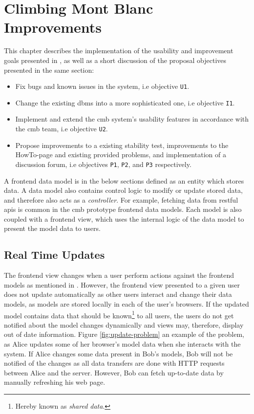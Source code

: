 \chapter{Climbing Mont Blanc Improvements}
\label{ch:improvements}
This chapter describes the implementation of the usability and improvement goals presented in , as well as a short discussion of the proposal objectives presented in the same section:
\begin{itemize}
    \item Fix bugs and known issues in the system, i.e objective \texttt{U1}.
    \item Change the existing \gls{dbms} into a more sophisticated one, i.e objective \texttt{I1}.
    \item Implement and extend the \gls{cmb} system's usability features in accordance with the \gls{cmb} team, i.e objective \texttt{U2}.
    \item Propose improvements to a existing stability test, improvements to the HowTo-page and existing provided problems, and implementation of a discussion forum, i.e objectives \texttt{P1}, \texttt{P2}, and \texttt{P3} respectively.
\end{itemize}
A frontend data model is in the below sections defined as an entity which stores data. A data model also contains control logic to modify or update stored data, and therefore also acts as a \textit{controller}. For example, fetching data from \gls{rest}ful \glspl{api} is common in the \gls{cmb} prototype frontend data models. Each model is also coupled with a frontend view, which uses the internal logic of the data model to present the model data to users.
\clearpage
\section{Real Time Updates}
\label{sec:real-time}
The frontend view changes when a user perform actions against the frontend models as mentioned in . However, the frontend view presented to a given user does not update automatically as other users interact and change their data models, as models are stored locally in each of the user's browsers. If the updated model contains data that should be known\footnote{Hereby known as \textit{shared data}.} to all users, the users do not get notified about the model changes dynamically and views may, therefore, display out of date information. Figure \ref{fig:update-problem} an example of the problem, as Alice updates some of her browser’s model data when she interacts with the system. If Alice changes some data present in Bob’s models, Bob will not be notified of the changes as all data transfers are done with HTTP requests between Alice and the server. However, Bob can fetch up-to-date data by manually refreshing his web page. \\

